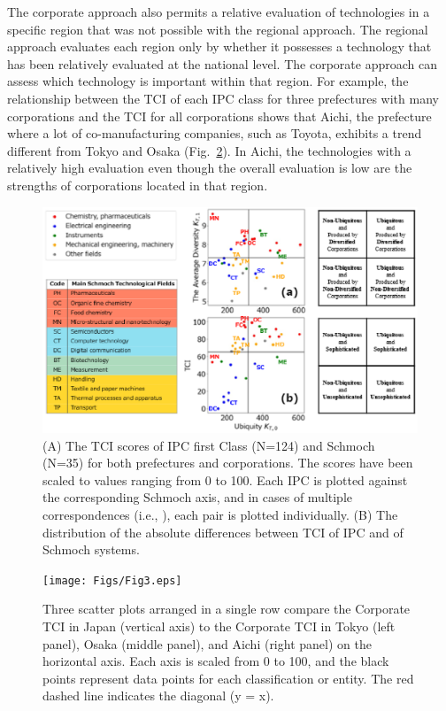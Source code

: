 \documentclass[fleqn,10pt]{wlscirep}
\begin{document}
The corporate approach also permits a relative evaluation of technologies in a specific region that was not possible with the regional approach. The regional approach evaluates each region only by whether it possesses a technology that has been relatively evaluated at the national level. The corporate approach can assess which technology is important within that region. For example, the relationship between the TCI of each IPC class for three prefectures with many corporations and the TCI for all corporations shows that Aichi, the prefecture where a lot of co-manufacturing companies, such as Toyota, exhibits a trend different from Tokyo and Osaka (Fig.~\ref{fig:prefcompare}). In Aichi, the technologies with a relatively high evaluation even though the overall evaluation is low are the strengths of corporations located in that region.


\begin{figure}[ht]
    \centering
    \includegraphics[scale=0.65]{Figs/Fig2.eps}
    \caption{(A) The TCI scores of IPC first Class (N=124) and Schmoch (N=35) for both prefectures and corporations. The scores have been scaled to values ranging from 0 to 100. Each IPC is plotted against the corresponding Schmoch axis, and in cases of multiple correspondences (i.e., ), each pair is plotted individually. (B) The distribution of the absolute differences between TCI of IPC and of Schmoch systems.}
    \label{fig:detailtci}
\end{figure}


\begin{figure}[ht]
    \centering
    \texttt{[image: Figs/Fig3.eps]}
    \caption{Three scatter plots arranged in a single row compare the Corporate TCI in Japan (vertical axis) to the Corporate TCI in Tokyo (left panel), Osaka (middle panel), and Aichi (right panel) on the horizontal axis. Each axis is scaled from 0 to 100, and the black points represent data points for each classification or entity. The red dashed line indicates the diagonal (y = x).}
    \label{fig:prefcompare}
\end{figure}
\end{document}

